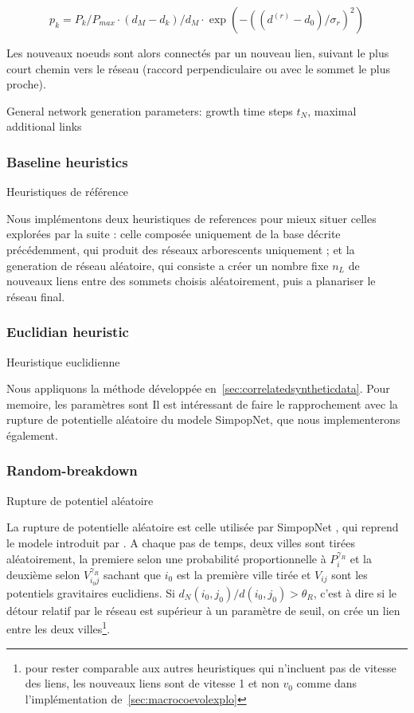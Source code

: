 \[
p_k = P_k/P_{max} \cdot (d_M - d_k)/d_M \cdot \exp\left(-((d^{(r)} - d_0)/\sigma_r)^2\right)
\]


Les nouveaux noeuds sont alors connectés par un nouveau lien, suivant le plus court chemin vers le réseau (raccord perpendiculaire ou avec le sommet le plus proche).

General network generation parameters: growth time steps $t_N$, maximal additional links


\subsubsection{Baseline heuristics}{Heuristiques de référence}

Nous implémentons deux heuristiques de references pour mieux situer celles explorées par la suite : celle composée uniquement de la base décrite précédemment, qui produit des réseaux arborescents uniquement ; et la generation de réseau aléatoire, qui consiste a créer un nombre fixe $n_L$ de nouveaux liens entre des sommets choisis aléatoirement, puis a planariser le réseau final.



\subsubsection{Euclidian heuristic}{Heuristique euclidienne}

Nous appliquons la méthode développée en~\ref{sec:correlatedsyntheticdata}. Pour memoire, les paramètres sont 
Il est intéressant de faire le rapprochement avec la rupture de potentielle aléatoire du modele SimpopNet, que nous implementerons également.





\subsubsection{Random-breakdown}{Rupture de potentiel aléatoire}

La rupture de potentielle aléatoire est celle utilisée par SimpopNet \cite{schmitt2014modelisation}, qui reprend le modele introduit par \cite{blumenfeld2010network}. A chaque pas de temps, deux villes sont tirées aléatoirement, la premiere selon une probabilité proportionnelle à $P_i^{\gamma_R}$ et la deuxième selon $V_{i_0j}^{\gamma_R}$ sachant que $i_0$ est la première ville tirée et $V_{ij}$ sont les potentiels gravitaires euclidiens. Si $d_N(i_0,j_0) / d(i_0,j_0) > \theta_R$, c'est à dire si le détour relatif par le réseau est supérieur à un paramètre de seuil, on crée un lien entre les deux villes\footnote{pour rester comparable aux autres heuristiques qui n'incluent pas de vitesse des liens, les nouveaux liens sont de vitesse 1 et non $v_0$ comme dans l'implémentation de~\ref{sec:macrocoevolexplo}}.







